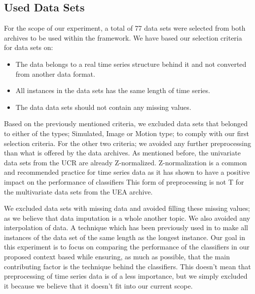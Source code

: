 \subsection{Used Data Sets}
\label{used data sets}
For the scope of our experiment, a total of 77 data sets were selected from both archives to be used within the framework.
We have based our selection criteria for data sets on:
\begin{itemize}
    \item The data belongs to a real time series structure behind it and not converted from another data format.
    \item All instances in the data sets has the same length of time series.
    \item The data data sets should not contain any missing values.
\end{itemize}
Based on the previously mentioned criteria, we excluded data sets that belonged to either of the types; Simulated, Image or Motion type; to comply with our first selection criteria.
For the other two criteria; we avoided any further preprocessing than what is offered by the data archives.
As mentioned before, the univariate data sets from the UCR are already Z-normalized.
Z-normalization is a common and recommended practice for time series data as it has shown to have a positive impact on the performance of classifiers \cite{bagnall2017great,fawaz2019deepreview}
This form of preprocessing is not T for the multivariate data sets from the UEA archive.

We excluded data sets with missing data and avoided filling these missing values; as we believe that data imputation is a whole another topic.
We also avoided any interpolation of data. A technique which has been previously used in \cite{ratanamahatana2005three, fawaz2019deepreview} to make all instances of the data set of the same length as the longest instance.
Our goal in this experiment is to focus on comparing the performance of the classifiers in our proposed context based while ensuring, as much as possible, that the main contributing factor is the technique behind the classifiers.
This doesn't mean that preprocessing of time series data is of a less importance, but we simply excluded it because we believe that it doesn't fit into our current scope.

